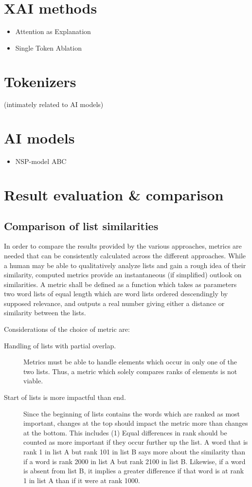 \section{XAI methods}
\begin{itemize}
	\item Attention as Explanation
	\item Single Token Ablation
\end{itemize}

\section{Tokenizers}
 (intimately related to AI models)
\section{AI models}
\begin{itemize}
	\item NSP-model ABC
\end{itemize}

\section{Result evaluation \& comparison}

\subsection{Comparison of list similarities}
In order to compare the results provided by the various approaches, metrics are needed that can be consistently calculated across the different approaches.
While a human may be able to qualitatively analyze lists and gain a rough idea of their similarity, computed metrics provide an instantaneous (if simplified) outlook on similarities.
A metric shall be defined as a function which takes as parameters two word lists of equal length which are word lists ordered descendingly by supposed relevance, and outputs a real number giving either a distance or similarity between the lists.

Considerations of the choice of metric are:

\begin{description}
	\item [Handling of lists with partial overlap.]
	      Metrics must be able to handle elements which occur in only one of the two lists.
	      Thus, a metric which solely compares ranks of elements is not viable.
	\item [Start of lists is more impactful than end.]
	      Since the beginning of lists contains the words which are ranked as most important, changes at the top should impact the metric more than changes at the bottom. This includes (1) Equal differences in rank should be counted as more important if they occur further up the list.
	      A word that is rank 1 in list A but rank 101 in list B says more about the similarity than if a word is rank 2000 in list A but rank 2100 in list B. Likewise, if a word is absent from list B, it implies a greater difference if that word is at rank 1 in list A than if it were at rank 1000.
\end{description}


